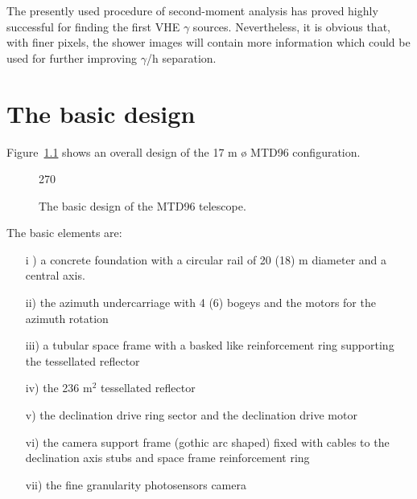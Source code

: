 The presently used procedure of second-moment analysis has proved 
highly successful for finding 
the first VHE $\gamma$ sources. Nevertheless, it is obvious 
that, with finer pixels, the shower images 
will contain more information which could be used for 
further improving $\gamma$/h separation.
\newpage

\begin{figure}[t]
\leavevmode
\centering
\epsfxsize=15cm
\end{figure}
\newpage
                      


\setcounter{chapter}{3}

\chapter{The basic design}


\medskip Figure~\ref{fig-basic} shows an overall design of the 17 m
{\o}  MTD96
configuration.

\begin{figure}[h] \centering \leavevmode
\begin{turn}{270}
\end{turn}
\vspace{1cm}
\caption{\label{fig-basic}
The basic design of the MTD96 telescope.}
\end{figure}


\newpage
The basic
elements are:

\begin{itemize}
\item[i]  ) a concrete foundation with a circular rail of 20 (18) m diameter
and a central axis.

\item[ii)]  the azimuth undercarriage with 4 (6) bogeys and the motors for
the azimuth rotation

\item[iii)]  a tubular space frame with a basked like reinforcement ring
supporting the tessellated reflector

\item[iv)]  the 236 m$^{2}$ tessellated reflector

\item[v)]  the declination drive ring sector and the declination drive motor

\item[vi)]  the camera support frame (gothic arc shaped) fixed with cables
to the declination axis stubs and space frame reinforcement ring

\item[vii)]  the fine granularity photosensors camera
\end{itemize}

